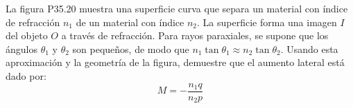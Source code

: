 \item La figura P35.20 muestra una superficie curva que separa un material con índice de refracción $n_1$ de un material con índice $n_2$. La superficie forma una imagen $I$ del objeto $O$ a través de refracción. Para rayos paraxiales, se supone que los ángulos $\theta_1$ y $\theta_2$ son pequeños, de modo que $n_1 \tan\theta_1 \approx n_2 \tan\theta_2$. Usando esta aproximación y la geometría de la figura, demuestre que el aumento lateral está dado por:
$$ M = -\frac{n_1 q}{n_2 p} $$